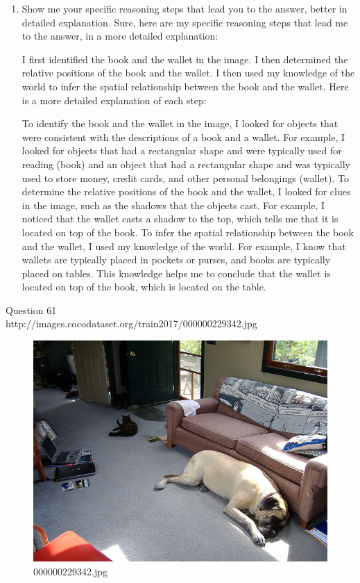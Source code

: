 \begin{enumerate}
    Here are some additional details about the spatial relationship between the book and the wallet:
    
    The book is a printed text that is typically used for reading.
    The wallet is a small, rectangular container that is used to store money, credit cards, and other personal belongings.
    The wallet is located on top of the book, meaning that it is resting on the book.
    The book is located below the wallet, meaning that it is supporting the wallet.
    I hope this helps! Let me know if you have other requests or questions.
    \item Show me your specific reasoning steps that lead you to the answer, better in detailed explanation.
    \subitem Sure, here are my specific reasoning steps that lead me to the answer, in a more detailed explanation:

    I first identified the book and the wallet in the image.
    I then determined the relative positions of the book and the wallet.
    I then used my knowledge of the world to infer the spatial relationship between the book and the wallet.
    Here is a more detailed explanation of each step:
    
    To identify the book and the wallet in the image, I looked for objects that were consistent with the descriptions of a book and a wallet. For example, I looked for objects that had a rectangular shape and were typically used for reading (book) and an object that had a rectangular shape and was typically used to store money, credit cards, and other personal belongings (wallet).
    To determine the relative positions of the book and the wallet, I looked for clues in the image, such as the shadows that the objects cast. For example, I noticed that the wallet casts a shadow to the top, which tells me that it is located on top of the book.
    To infer the spatial relationship between the book and the wallet, I used my knowledge of the world. For example, I know that wallets are typically placed in pockets or purses, and books are typically placed on tables. This knowledge helps me to conclude that the wallet is located on top of the book, which is located on the table.
\end{enumerate}
Question 61\\
http://images.cocodataset.org/train2017/000000229342.jpg
\begin{figure}[h]
    \centering
    \includegraphics[width=0.8\linewidth]{../image set/hard/000000229342.jpg}
    \caption{000000229342.jpg}
\end{figure}
